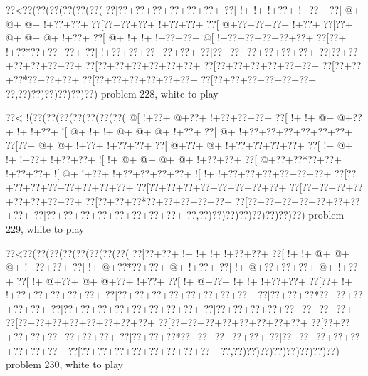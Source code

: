 \vbox{\vbox{\goo
\0??<\0??(\0??(\0??(\0??(\0??(\0??(
\0??[\0??+\0??+\0??+\0??+\0??+\0??+
\0??[\- !+\- !+\- !+\0??+\- !+\0??+
\0??[\- @+\- @+\- @+\- !+\0??+\0??+
\0??[\0??+\0??+\0??+\- !+\0??+\0??+
\0??[\- @+\0??+\0??+\0??+\- !+\0??+
\0??[\0??+\- @+\- @+\- @+\- !+\0??+
\0??[\- @+\- !+\- !+\- !+\0??+\0??+
\- @[\- !+\0??+\0??+\0??+\0??+\0??+
\0??[\0??+\- !+\0??*\0??+\0??+\0??+
\0??[\- !+\0??+\0??+\0??+\0??+\0??+
\0??[\0??+\0??+\0??+\0??+\0??+\0??+
\0??[\0??+\0??+\0??+\0??+\0??+\0??+
\0??[\0??+\0??+\0??+\0??+\0??+\0??+
\0??[\0??+\0??+\0??+\0??+\0??+\0??+
\0??[\0??+\0??+\0??*\0??+\0??+\0??+
\0??[\0??+\0??+\0??+\0??+\0??+\0??+
\0??[\0??+\0??+\0??+\0??+\0??+\0??+
\0??,\0??)\0??)\0??)\0??)\0??)\0??)
}
\hfil problem 228, white to play\hfil\break
}

\vbox{\vbox{\goo
\0??<\- !(\0??(\0??(\0??(\0??(\0??(\0??(\0??(
\- @[\- !+\0??+\- @+\0??+\- !+\0??+\0??+\0??+
\0??[\- !+\- !+\- @+\- @+\0??+\- !+\- !+\0??+
\- ![\- @+\- !+\- !+\- @+\- @+\- @+\- !+\0??+
\0??[\- @+\- !+\0??+\0??+\0??+\0??+\0??+\0??+
\0??[\0??+\- @+\- @+\- !+\0??+\- !+\0??+\0??+
\0??[\- @+\0??+\- @+\- !+\0??+\0??+\0??+\0??+
\0??[\- !+\- @+\- !+\- !+\0??+\- !+\0??+\0??+
\- ![\- !+\- @+\- @+\- @+\- @+\- !+\0??+\0??+
\0??[\- @+\0??+\0??*\0??+\0??+\- !+\0??+\0??+
\- ![\- @+\- !+\0??+\- !+\0??+\0??+\0??+\0??+
\- ![\- !+\- !+\0??+\0??+\0??+\0??+\0??+\0??+
\0??[\0??+\0??+\0??+\0??+\0??+\0??+\0??+\0??+
\0??[\0??+\0??+\0??+\0??+\0??+\0??+\0??+\0??+
\0??[\0??+\0??+\0??+\0??+\0??+\0??+\0??+\0??+
\0??[\0??+\0??+\0??*\0??+\0??+\0??+\0??+\0??+
\0??[\0??+\0??+\0??+\0??+\0??+\0??+\0??+\0??+
\0??[\0??+\0??+\0??+\0??+\0??+\0??+\0??+\0??+
\0??,\0??)\0??)\0??)\0??)\0??)\0??)\0??)\0??)
}
\hfil problem 229, white to play\hfil\break
}

\vbox{\vbox{\goo
\0??<\0??(\0??(\0??(\0??(\0??(\0??(\0??(\0??(
\0??[\0??+\0??+\- !+\- !+\- !+\- !+\0??+\0??+
\0??[\- !+\- !+\- @+\- @+\- @+\- !+\0??+\0??+
\0??[\- !+\- @+\0??*\0??+\0??+\- @+\- !+\0??+
\0??[\- !+\- @+\0??+\0??+\0??+\- @+\- !+\0??+
\0??[\- !+\- @+\0??+\- @+\- @+\0??+\- !+\0??+
\0??[\- !+\- @+\0??+\- !+\- !+\- !+\0??+\0??+
\0??[\0??+\- !+\- !+\0??+\0??+\0??+\0??+\0??+
\0??[\0??+\0??+\0??+\0??+\0??+\0??+\0??+\0??+
\0??[\0??+\0??+\0??*\0??+\0??+\0??+\0??+\0??+
\0??[\0??+\0??+\0??+\0??+\0??+\0??+\0??+\0??+
\0??[\0??+\0??+\0??+\0??+\0??+\0??+\0??+\0??+
\0??[\0??+\0??+\0??+\0??+\0??+\0??+\0??+\0??+
\0??[\0??+\0??+\0??+\0??+\0??+\0??+\0??+\0??+
\0??[\0??+\0??+\0??+\0??+\0??+\0??+\0??+\0??+
\0??[\0??+\0??+\0??*\0??+\0??+\0??+\0??+\0??+
\0??[\0??+\0??+\0??+\0??+\0??+\0??+\0??+\0??+
\0??[\0??+\0??+\0??+\0??+\0??+\0??+\0??+\0??+
\0??,\0??)\0??)\0??)\0??)\0??)\0??)\0??)\0??)
}
\hfil problem 230, white to play\hfil\break
}

